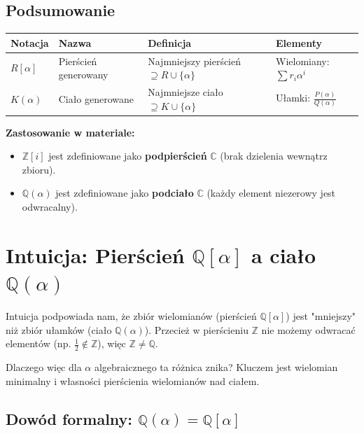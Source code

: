 \subsection*{Podsumowanie}
\begin{center}
\begin{tabular}{|l|l|l|l|}
\hline
\textbf{Notacja} & \textbf{Nazwa} & \textbf{Definicja} & \textbf{Elementy} \\ \hline
$R[\alpha]$ & Pierścień generowany & Najmniejszy pierścień $\supseteq R \cup \{\alpha\}$ & Wielomiany: $\sum r_i \alpha^i$ \\ \hline
$K(\alpha)$ & Ciało generowane & Najmniejsze ciało $\supseteq K \cup \{\alpha\}$ & Ułamki: $\frac{P(\alpha)}{Q(\alpha)}$ \\ \hline
\end{tabular}
\end{center}

\textbf{Zastosowanie w materiale:}
\begin{itemize}
    \item $\mathbb{Z}[i]$ jest zdefiniowane jako \textbf{podpierścień} $\mathbb{C}$ (brak dzielenia wewnątrz zbioru).
    \item $\mathbb{Q}(\alpha)$ jest zdefiniowane jako \textbf{podciało} $\mathbb{C}$ (każdy element niezerowy jest odwracalny).
\end{itemize}
\section*{Intuicja: Pierścień $\mathbb{Q}[\alpha]$ a ciało $\mathbb{Q}(\alpha)$}

Intuicja podpowiada nam, że zbiór wielomianów (pierścień $\mathbb{Q}[\alpha]$) jest "mniejszy" niż zbiór ułamków (ciało $\mathbb{Q}(\alpha)$). Przecież w pierścieniu $\mathbb{Z}$ nie możemy odwracać elementów (np. $\frac{1}{2} \notin \mathbb{Z}$), więc $\mathbb{Z} \neq \mathbb{Q}$. 

Dlaczego więc dla $\alpha$ algebraicznego ta różnica znika? Kluczem jest wielomian minimalny i własności pierścienia wielomianów nad ciałem.

\subsection*{Dowód formalny: $\mathbb{Q}(\alpha) = \mathbb{Q}[\alpha]$}

